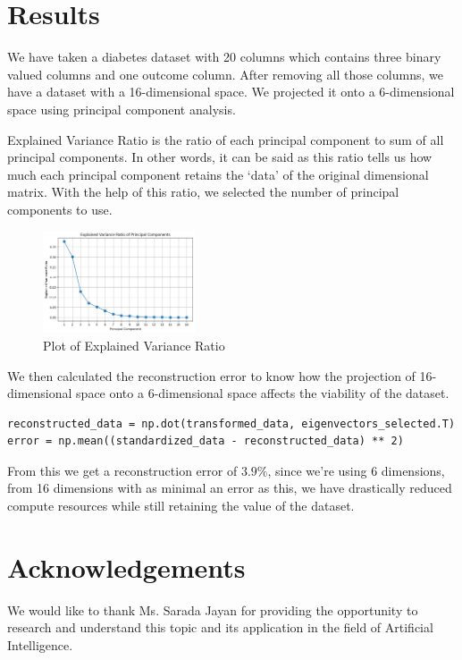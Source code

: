 \documentclass[conference]{IEEEtran}
\begin{document}
\section{Results}

We have taken a diabetes dataset with 20 columns which contains three binary valued columns and one outcome column. After removing all those columns, we have a dataset with a 16-dimensional space. We projected it onto a 6-dimensional space using principal component analysis.

Explained Variance Ratio is the ratio of each principal component to sum of all principal components. In other words, it can be said as this ratio tells us how much each principal component retains the ‘data’ of the original dimensional matrix. With the help of this ratio, we selected the number of principal components to use.

\begin{figure}
	\includegraphics[width=0.4\textwidth]{assets/plot.png}
	\caption{Plot of Explained Variance Ratio}
\end{figure}

We then calculated the reconstruction error to know how the projection of 16-dimensional space onto a 6-dimensional space affects the viability of the dataset.

\begin{lstlisting}[breaklines]
reconstructed_data = np.dot(transformed_data, eigenvectors_selected.T)
error = np.mean((standardized_data - reconstructed_data) ** 2)
\end{lstlisting}

From this we get a reconstruction error of $3.9\%$, since we're using 6 dimensions, from 16 dimensions with as minimal an error as this, we have drastically reduced compute resources while still retaining the value of the dataset.

\section{Acknowledgements}
We would like to thank Ms. Sarada Jayan for providing the opportunity to research and understand this topic and its application in the field of Artificial Intelligence.
\end{document}
